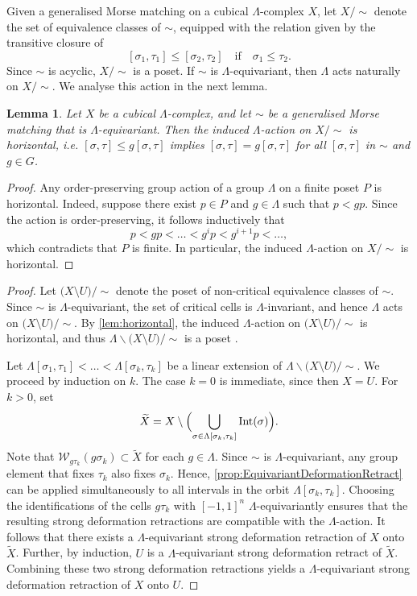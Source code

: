\documentclass[reqno,dvipsnames]{amsart}
\theoremstyle{plain}
\newtheorem{lemma}[theorem]{Lemma}
\numberwithin{equation}{section}
\theoremstyle{definition}
\DeclareMathOperator{\Int}{Int}
\begin{document}
Given a generalised Morse matching on a cubical $\Lambda$-complex $X$, let $X/\sim$ denote the set of equivalence classes of $\sim$, equipped with the relation  given by the transitive closure of
\[
	[\sigma_1, \tau_1] \leq [\sigma_2, \tau_2] \quad \text{if} \quad \sigma_1 \leq \tau_2.
\]
Since $\sim$ is acyclic, $X/\sim$ is a poset. If $\sim$ is $\Lambda$-equivariant, then $\Lambda$ acts naturally on $X/\sim$. We analyse this action in the next lemma.

\begin{lemma} \label{lem:horizontal}
	Let $X$ be a cubical $\Lambda$-complex, and let $\sim$ be a generalised Morse matching that is $\Lambda$-equivariant. Then the induced $\Lambda$-action on $X/\sim$ is horizontal, i.e. $[\sigma, \tau]\leq g[\sigma,\tau]$ implies $[\sigma, \tau] = g[\sigma,\tau]$ for all $[\sigma,\tau]$ in $\sim$ and $g\in G$.
\end{lemma}

\begin{proof}
	Any order-preserving group action of a group $\Lambda$ on a finite poset $P$ is horizontal. Indeed, suppose there exist $p\in P$ and $g\in \Lambda$ such that $p < gp$. Since the action is order-preserving, it follows inductively that
	\[
		p < gp < \ldots < g^ip < g^{i+1}p < \ldots,
	\]
	which contradicts that $P$ is finite. In particular, the induced $\Lambda$-action on $X/\sim$ is horizontal.
\end{proof}

\GeneralizedMorse*

\begin{proof}
	Let $\bigl(X\setminus U\bigr)/\sim$ denote the poset of non-critical equivalence classes of $\sim$. Since $\sim$ is $\Lambda$-equivariant, the set of critical cells is $\Lambda$-invariant, and hence $\Lambda$ acts on $\bigl(X\setminus U\bigr)/\sim$. By \autoref{lem:horizontal}, the induced $\Lambda$-action on $\bigl(X\setminus U\bigr)/\sim$ is  horizontal, and thus $\Lambda\backslash\bigl(X\setminus U\bigr)/\sim$ is a poset \cite{Babson05}.
	
	Let $\Lambda[\sigma_1, \tau_1] < \ldots < \Lambda[\sigma_k, \tau_k]$ be a linear extension of $\Lambda \backslash \bigl(X\setminus U\bigr)/\sim$. We proceed by induction on $k$. The case $k = 0$ is immediate, since then $X=U$. For $k>0$, set 
	\[
		\widetilde{X} = X\setminus \Bigl(\bigcup_{\sigma\in \Lambda[\sigma_k,\tau_k]} \Int(\sigma) \Bigr).
	\]
	Note that $\mathcal{W}_{g\tau_k}(g\sigma_k) \subset \tilde{X}$ for each $g\in \Lambda$. Since $\sim$ is $\Lambda$-equivariant, any group element that fixes $\tau_k$ also fixes $\sigma_k$. Hence, \autoref{prop:EquivariantDeformationRetract} can be applied simultaneously to all intervals in the orbit $\Lambda[\sigma_k, \tau_k]$. Choosing the identifications of the cells $g\tau_k$ with $[-1,1]^n$ $\Lambda$-equivariantly ensures that the resulting strong deformation retractions are compatible with the $\Lambda$-action. It follows that there exists a $\Lambda$-equivariant strong deformation retraction of $X$ onto $\widetilde{X}$. Further, by induction, $U$ is a $\Lambda$-equivariant strong deformation retract of $\widetilde{X}$. Combining these two strong deformation retractions yields a $\Lambda$-equivariant strong deformation retraction of $X$ onto $U$.
\end{proof}
\end{document}
